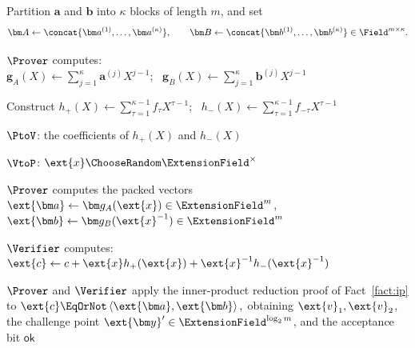 \begin{algorithm}[!t]
\caption{Packed inner-product proof}
\label{alg:ip}

Partition \(\bm a\) and \(\bm b\) into \(\kappa\) blocks of
length \(m\), and set
\[
    \bm A
    \leftarrow
    \concat{
        \bm a^{(1)},\ldots,\bm a^{(\kappa)}
    },
    \qquad
    \bm B
    \leftarrow
    \concat{
        \bm b^{(1)},\ldots,\bm b^{(\kappa)}
    }
    \in\Field^{m\times\kappa}.
\]

$\Prover$ computes:\\
\Indp
\(
    \bm g_A(X)
    \leftarrow
    \sum_{j=1}^{\kappa}
    \bm a^{(j)}X^{j-1}
\);~
\(
    \bm g_B(X)
    \leftarrow
    \sum_{j=1}^{\kappa}
    \bm b^{(j)}X^{j-1}
\)\;


Construct
\(
    h_+(X)
    \leftarrow
    \sum_{\tau=1}^{\kappa-1}
    f_\tau X^{\tau-1}
\);~
\(
    h_-(X)
    \leftarrow
    \sum_{\tau=1}^{\kappa-1}
    f_{-\tau}X^{\tau-1}
\)\;
\Indm

\(\PtoV\):
the coefficients of \(h_+(X)\) and \(h_-(X)\)\;

\(\VtoP\):
\(\ext{x}\ChooseRandom\ExtensionField^\times\)\;

$\Prover$ computes the packed vectors
\(
    \ext{\bm a}
    \leftarrow
    \bm g_A(\ext{x})
    \in\ExtensionField^m
\),
\(
    \ext{\bm b}
    \leftarrow
    \bm g_B(\ext{x}^{-1})
    \in\ExtensionField^m
\)\;

$\Verifier$ computes:
\(
    \ext{c}
    \leftarrow
    c
    +\ext{x}h_+(\ext{x})
    +\ext{x}^{-1}h_-(\ext{x}^{-1})
\)\;

$\Prover$ and $\Verifier$ apply the inner-product reduction proof of Fact~\ref{fact:ip} to
\(
    \ext{c}
    \EqOrNot
    \left\langle
        \ext{\bm a},\ext{\bm b}
    \right\rangle,
\)
obtaining
\(
    \ext{v}_1,\ext{v}_2
\),
the challenge point
\(
    \ext{\bm y}'\in
    \ExtensionField^{\log_2m}
\),
and the acceptance bit \(\mathsf{ok}\)\;


\end{algorithm}
